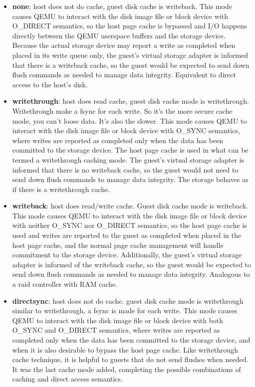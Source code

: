 \documentclass{acmsig}
\begin{document}
\begin{itemize}
 \item \textbf{none}: host does not do cache, guest disk cache is writeback. This mode causes QEMU to interact with the disk image file or block device with O\_DIRECT semantics, so the host page cache is bypassed and I/O happens directly between the QEMU userspace buffers and the storage device. Because the actual storage device may report a write as completed when placed in its write queue only, the guest's virtual storage adapter is informed that there is a writeback cache, so the guest would be expected to send down flush commands as needed to manage data integrity. Equivalent to direct access to the host's disk.
 \item \textbf{writethrough}: host does read cache, guest disk cache mode is writethrough. Writethrough make a fsync for each write. So it's the more secure cache mode, you can't loose data. It's also the slower. This mode causes QEMU to interact with the disk image file or block device with O\_SYNC semantics, where writes are reported as completed only when the data has been committed to the storage device. The host page cache is used in what can be termed a writethrough caching mode. The guest's virtual storage adapter is informed that there is no writeback cache, so the guest would not need to send down flush commands to manage data integrity. The storage behaves as if there is a writethrough cache.
 \item \textbf{writeback}: host does read/write cache. Guest disk cache mode is writeback. This mode causes QEMU to interact with the disk image file or block device with neither O\_SYNC nor O\_DIRECT semantics, so the host page cache is used and writes are reported to the guest as completed when placed in the host page cache, and the normal page cache management will handle commitment to the storage device. Additionally, the guest's virtual storage adapter is informed of the writeback cache, so the guest would be expected to send down flush commands as needed to manage data integrity. Analogous to a raid controller with RAM cache.
 \item \textbf{directsync}: host does not do cache. guest disk cache mode is writethrough similar to writethrough, a fsync is made for each write. This mode causes QEMU to interact with the disk image file or block device with both O\_SYNC and O\_DIRECT semantics, where writes are reported as completed only when the data has been committed to the storage device, and when it is also desirable to bypass the host page cache. Like writethrough cache technique, it is helpful to guests that do not send flushes when needed. It was the last cache mode added, completing the possible combinations of caching and direct access semantics.
\end{itemize}
\end{document}

